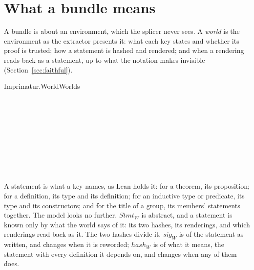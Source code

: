 \documentclass[acmsmall,screen,review,anonymous,nonacm]{acmart}
\begin{document}
\section{What a bundle means}\label{sec:meaning}

A bundle is about an environment, which the splicer never sees. A
\emph{world} is the environment as the extractor presents it: what each key
states and whether its proof is trusted; how a statement is hashed and
rendered; and when a rendering reads back as a statement, up to what the
notation makes invisible (Section~\ref{sec:faithful}).

\begin{leangrammar}[sum=fsA8oFAYhv, dflt=ZXPQgExx8a]{Imprimatur.World}{Worlds}
\label{gram:Imprimatur.World}\begin{LeanDisplay}
\\
\\
\\
\\
\\
\\
\\
\\
\end{LeanDisplay}
\end{leangrammar}

A statement is what a key names, as Lean holds it: for a theorem, its
proposition; for a definition, its type and its definition; for an
inductive type or predicate, its type and its constructors; and for the
title of a group, its members' statements together. The model looks no
further. $\mathit{Stmt}_{W}$ is abstract, and a statement is known only by
what the world says of it: its two hashes, its renderings, and which
renderings read back as it. The two hashes divide it. $\mathit{sig}_{W}$
is of the statement as written, and changes when it is reworded;
$\mathit{hash}_{W}$ is of what it means, the statement with every
definition it depends on, and changes when any of them does.
\end{document}

